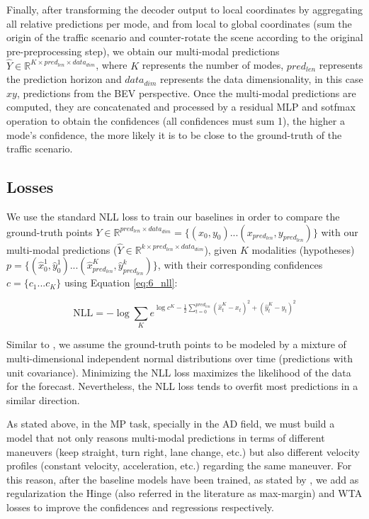 Finally, after transforming the decoder output to local coordinates by aggregating all relative predictions per mode, and from local to global coordinates (sum the origin of the traffic scenario and counter-rotate the scene according to the original pre-preprocessing step), we obtain our multi-modal predictions $\hat{Y} \in \mathbb{R}^{K \times pred_{len} \times data_{dim}}$, where $K$ represents the number of modes, $pred_{len}$ represents the prediction horizon and $data_{dim}$ represents the data dimensionality, in this case $xy$, predictions from the \ac{BEV} perspective. Once the multi-modal predictions are computed, they are concatenated and processed by a residual \ac{MLP} and sotfmax operation to obtain the confidences (all confidences must sum 1), the higher a mode's confidence, the more likely it is to be close to the ground-truth of the traffic scenario.

\subsection{Losses}
\label{subsec:6_efficient_baselines_losses}

We use the standard \acf{NLL} loss to train our baselines in order to compare the ground-truth points $Y \in \mathbb{R}^{pred_{len} \times data_{dim}} = \{(x_0,y_0) ... (x_{pred_{len}}, y_{pred_{len}})\}$ with our multi-modal predictions ($\hat{Y} \in \mathbb{R}^{k \times pred_{len} \times data_{dim}}$), given $K$ modalities (hypotheses) $p=\{(\hat{x}^1_0,\hat{y}^1_0) ... (\hat{x}^K_{pred_{len}}, \hat{y}^k_{pred_{len}})\}$, with their corresponding confidences $c=\{c_1 ... c_K\}$ using Equation \ref{eq:6_nll}:

\begin{equation}
	\text{NLL} = -\log \sum_{K} e^{ \log{c^K} - \frac{1}{2} \sum_{t=0}^{pred_{len}} (\hat{x}^K_t - x_t)^2 + (\hat{y}^K_t - y_t )^2 }
	\label{eq:6_nll}
\end{equation}

Similar to \cite{mercat2020multi}, we assume the ground-truth points to be modeled by a mixture of multi-dimensional independent normal distributions over time (predictions with unit covariance). Minimizing the \ac{NLL} loss maximizes the likelihood of the data for the forecast. Nevertheless, the \ac{NLL} loss tends to overfit most predictions in a similar direction. 

As stated above, in the \ac{MP} task, specially in the \ac{AD} field, we must build a model that not only reasons multi-modal predictions in terms of different maneuvers (keep straight, turn right, lane change, etc.) but also different velocity profiles (constant velocity, acceleration, etc.) regarding the same maneuver. For this reason, after the baseline models have been trained, as stated by \cite{kim2022improving}, we add as regularization the Hinge (also referred in the literature as max-margin) and \acf{WTA} \cite{liang2020learning, kim2022improving} losses to improve the confidences and regressions respectively. 

